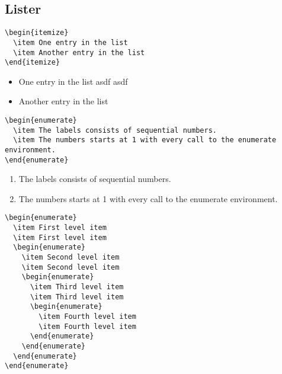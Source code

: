 \subsection{Lister}
\begin{verbatim}
\begin{itemize}
  \item One entry in the list
  \item Another entry in the list
\end{itemize}
\end{verbatim}

\begin{itemize}
  \item One entry in the list  asdf asdf 
  \item Another entry in the list
\end{itemize}

\begin{verbatim}
\begin{enumerate}
  \item The labels consists of sequential numbers.
  \item The numbers starts at 1 with every call to the enumerate environment.
\end{enumerate}
\end{verbatim}

\begin{enumerate}
  \item The labels consists of sequential numbers.
  \item The numbers starts at 1 with every call to the enumerate environment.
\end{enumerate}

\begin{verbatim}
\begin{enumerate}
  \item First level item
  \item First level item
  \begin{enumerate}
    \item Second level item
    \item Second level item
    \begin{enumerate}
      \item Third level item
      \item Third level item
      \begin{enumerate}
        \item Fourth level item
        \item Fourth level item
      \end{enumerate}
    \end{enumerate}
  \end{enumerate}
\end{enumerate}
\end{verbatim}

